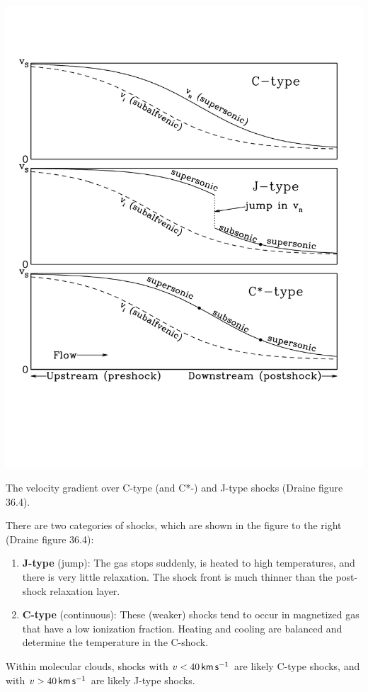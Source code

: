 \documentclass{tufte-handout}
\renewcommand{\textbf}[1]{{\bf \textcolor{dark-gray}{#1}}}
\renewcommand{\rm}{\sf}
\begin{document}
\begin{marginfigure}
\includegraphics[]{ism_figures/Draine-36_4}
\caption{The velocity gradient over C-type (and C*-) and J-type shocks (Draine figure 36.4).}
\end{marginfigure}

There are two categories of shocks, which are shown in the figure to the right (Draine figure 36.4):
\begin{enumerate}
\item \textbf{J-type} (jump): The gas stops suddenly, is heated to high temperatures, and there is very little relaxation. The shock front is much thinner than the post-shock relaxation layer. 
\item \textbf{C-type} (continuous): These (weaker) shocks tend to occur in magnetized gas that have a low ionization fraction. Heating and cooling are balanced and determine the temperature in the C-shock.
\end{enumerate}
Within molecular clouds, shocks with $v < 40 {\rm\, km\, s^{-1}}$ are likely C-type shocks, and with $v > 40 {\rm\, km\, s^{-1}}$ are likely J-type shocks.
\end{document}
